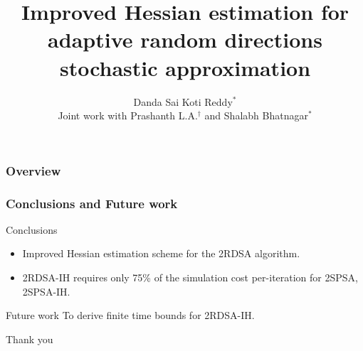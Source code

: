\documentclass{beamer}
\title[Stochastic optimization]{Improved Hessian estimation for adaptive random directions stochastic approximation} %
\author{ Danda Sai Koti Reddy$^*$\\[1.5ex]
{\footnotesize Joint work with Prashanth L.A.$^\dagger$ and Shalabh Bhatnagar$^*$}
} %
\institute %
{
$*$ Indian Institute of Science, Bangalore\\
$\dagger$ University of Maryland, College Park
}
\date{} %
\begin{document}
\begin{frame}
\titlepage 
\end{frame}

\begin{frame}
\frametitle{Overview}
\tableofcontents
\end{frame}



%



\begin{frame}
\frametitle{\centering  Conclusions and Future work}
\begin{block}{Conclusions}
\begin{itemize}
\item Improved Hessian estimation scheme for the 2RDSA algorithm.
\item  2RDSA-IH requires only 75\% of the simulation cost per-iteration for 2SPSA, 2SPSA-IH.
\end{itemize}
\end{block}
\begin{block}{Future work}
To derive finite time bounds for 2RDSA-IH.
\end{block}

\end{frame}



%
%


\begin{frame}

\begin{block}{}
\begin{center}
{\Huge Thank you}
\end{center}
\end{block}
\end{frame}
\end{document}
